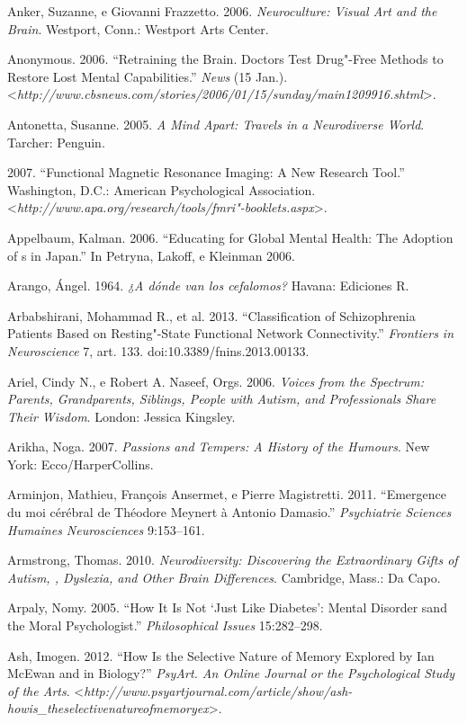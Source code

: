 Anker, Suzanne, e Giovanni Frazzetto. 2006. \emph{Neuroculture: Visual
Art and the Brain}. Westport, Conn.: Westport Arts Center.

Anonymous. 2006. ``Retraining the Brain. Doctors Test Drug"-Free Methods
to Restore Lost Mental Capabilities.'' \emph{ News} (15 Jan.).
\textless{}\emph{http://www.cbsnews.com/stories/2006/01/15/sunday/main1209916.shtml}\textgreater{}.

Antonetta, Susanne. 2005. \emph{A Mind Apart: Travels in a Neurodiverse
World}. Tarcher: Penguin.

 2007. ``Functional Magnetic Resonance Imaging: A New Research
Tool.'' Washington, D.C.: American Psychological Association.
\textless{}\emph{http://www.apa.org/research/tools/fmri"-booklets.aspx}\textgreater{}.

Appelbaum, Kalman. 2006. ``Educating for Global Mental Health: The
Adoption of s in Japan.'' In Petryna, Lakoff, e Kleinman 2006.

Arango, Ángel. 1964. \emph{¿A dónde van los cefalomos?} Havana:
Ediciones R.

Arbabshirani, Mohammad R., et al. 2013. ``Classification of
Schizophrenia Patients Based on Resting"-State Functional Network
Connectivity.'' \emph{Frontiers in Neuroscience} 7, art. 133.
doi:10.3389/fnins.2013.00133.

Ariel, Cindy N., e Robert A. Naseef, Orgs. 2006. \emph{Voices from the
Spectrum: Parents, Grandparents, Siblings, People with Autism, and
Professionals Share Their Wisdom}. London: Jessica Kingsley.

Arikha, Noga. 2007. \emph{Passions and Tempers: A History of the
Humours}. New York: Ecco/HarperCollins.

Arminjon, Mathieu, François Ansermet, e Pierre Magistretti. 2011.
``Emergence du moi cérébral de Théodore Meynert à Antonio Damasio.''
\emph{Psychiatrie Sciences Humaines Neurosciences} 9:153--161.

Armstrong, Thomas. 2010. \emph{Neurodiversity: Discovering the
Extraordinary Gifts of Autism, , Dyslexia, and Other Brain
Differences}. Cambridge, Mass.: Da Capo.

Arpaly, Nomy. 2005. ``How It Is Not `Just Like Diabetes': Mental
Disorder sand the Moral Psychologist.'' \emph{Philosophical Issues}
15:282--298.

Ash, Imogen. 2012. ``How Is the Selective Nature of Memory Explored by
Ian McEwan and in Biology?'' \emph{PsyArt. An Online Journal or the
Psychological Study of the Arts}.
\textless{}\emph{http://www.psyartjournal.com/article/show/ash-howis\_theselectivenatureofmemoryex}\textgreater{}.

